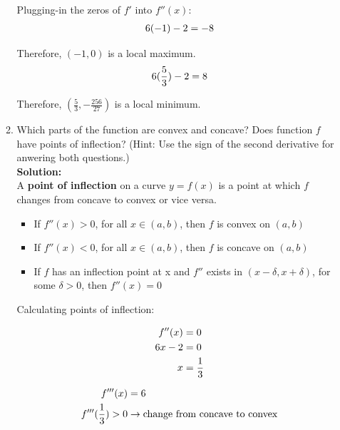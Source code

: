 \documentclass[a4paper]{article}
\begin{document}
\begin{enumerate}
\begin{enumerate}
Plugging-in the zeros of $f'$ into $f''(x)$:\\

\begin{align*}
	6(-1) -2 = -8\notag\\
\end{align*}

Therefore, $(-1,0)$ is a local maximum.\\

\begin{align*}
	6(\frac{5}{3}) -2 = 8\notag\\
\end{align*}

Therefore, $(\frac{5}{3},-\frac{256}{27})$ is a local minimum.\\

	
	\item Which parts of the function are convex and concave? Does function $f$ have points of inflection? (Hint: Use the sign of the second derivative for anwering both questions.)\\
	\textbf{Solution:}\\	
	
A \textbf{point of inflection} on a curve $y = f(x)$ is a point at which $f$ changes from concave to convex or vice versa.	
	
\begin{itemize}
	\item If $f''(x) > 0$, for all $x \in (a,b)$, then $f$ is convex on $(a,b)$
	\item If $f''(x) < 0$, for all $x \in (a,b)$, then $f$ is concave on $(a,b)$
	\item If $f$ has an inflection point at x and $f''$ exists in $(x - \delta, x + \delta)$, for some $\delta > 0$, then $f''(x) = 0$
\end{itemize}	

Calculating points of inflection:

\begin{align*}
f''(x) &= 0\notag\\
6x - 2 &= 0\notag\\
x &= \frac{1}{3}\notag
\end{align*}
				
\begin{align*}
	f'''(x) &= 6 \notag\\
	f'''(\frac{1}{3}) > 0 &\rightarrow \text{change from concave to convex}
\end{align*}		
\end{enumerate}


\end{enumerate}
\end{document}
